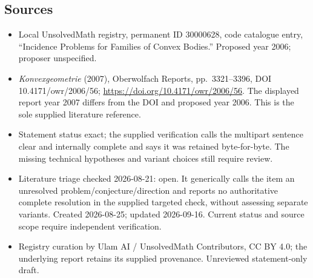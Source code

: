 \documentclass[11pt]{article}
\begin{document}
\subsection{Sources}
\begin{itemize}
\item Local UnsolvedMath registry, permanent ID 30000628, code catalogue entry, ``Incidence Problems for Families of Convex Bodies.'' Proposed year 2006; proposer unspecified.
\item \emph{Konvexgeometrie} (2007), Oberwolfach Reports, pp.\ 3321--3396, DOI 10.4171/owr/2006/56; \url{https://doi.org/10.4171/owr/2006/56}. The displayed report year 2007 differs from the DOI and proposed year 2006. This is the sole supplied literature reference.
\item Statement status exact; the supplied verification calls the multipart sentence clear and internally complete and says it was retained byte-for-byte. The missing technical hypotheses and variant choices still require review.
\item Literature triage checked 2026-08-21: open. It generically calls the item an unresolved problem/conjecture/direction and reports no authoritative complete resolution in the supplied targeted check, without assessing separate variants. Created 2026-08-25; updated 2026-09-16. Current status and source scope require independent verification.
\item Registry curation by Ulam AI / UnsolvedMath Contributors, CC BY 4.0; the underlying report retains its supplied provenance. Unreviewed statement-only draft.
\end{itemize}
\end{document}
